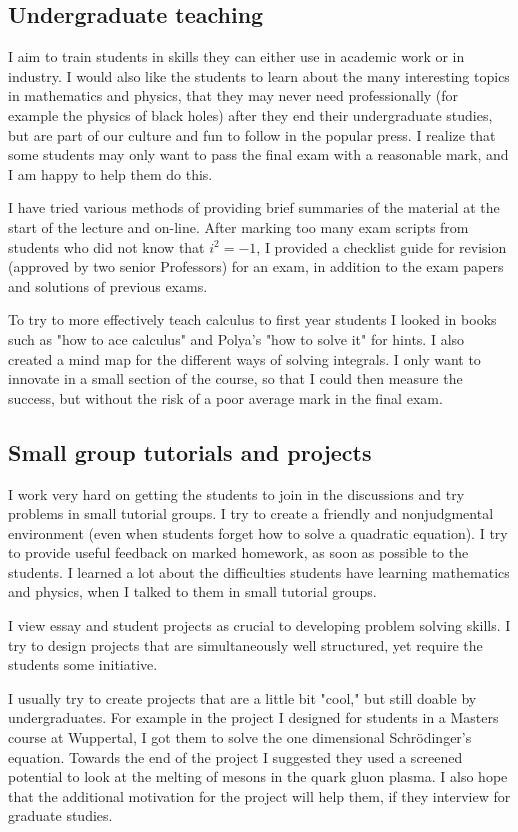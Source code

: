 \documentclass[12pt]{article}
\begin{document}
\subsection{Undergraduate teaching}

I aim to train students in skills they
can either use in academic work or in
industry. I would also like the students to
learn about the many interesting 
topics in mathematics and physics, that they may never 
need professionally (for example the physics of black holes)
after they end their undergraduate
studies, but are part of our culture and fun
to follow in the popular press.
I realize that some students may only want
to pass the final exam with a reasonable mark,
and I am happy to help them do this.

I have tried various methods of providing brief
summaries of the material at the start of the lecture
and on-line. After marking too many exam scripts from
students who did not know that $i^2 = -1$, I provided
a checklist guide for revision (approved by two senior
Professors) for an exam, 
in addition to the exam papers and solutions of previous exams.

To try to more effectively teach calculus to first year students I
looked in books such as "how to ace calculus" and Polya's "how to
solve it" for hints. I also created a mind map for the different ways
of solving integrals. I only want to innovate in a small section of
the course, so that I could then measure the success, but without the risk
of a poor average mark in the final exam.

\subsection{Small group tutorials and projects}


I work very hard on getting the students to join in the discussions
and try problems in small tutorial groups. I try to create
a friendly and nonjudgmental environment (even when
students forget how to solve a quadratic equation).
I try to provide useful feedback on marked homework,
as soon as possible to the students. I learned a lot
about the difficulties students have learning mathematics
and physics, when I talked to them in small tutorial
groups.

I view essay and student projects as crucial to developing
problem solving skills. I try to design projects
that are simultaneously well structured, yet require
the students some initiative.

I usually try to create projects
that are a little bit "cool," but still doable by undergraduates.
For example in the project I designed for students
in a Masters course at Wuppertal, I got them to solve
the one dimensional Schr\"{o}dinger's equation. Towards the end
of the project I suggested they used a screened potential
to look at the melting of mesons in the quark gluon
plasma. I also hope that the additional motivation for the
project will help them,
if they interview for graduate studies.
\end{document}
